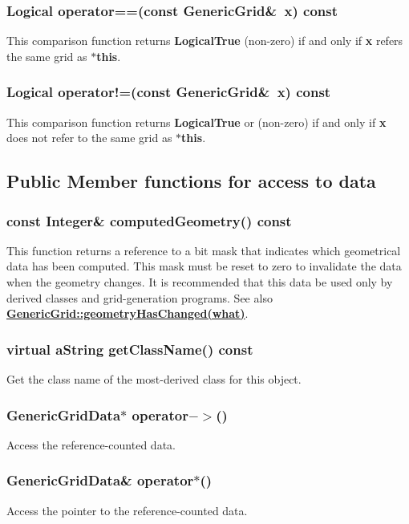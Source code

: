 \documentclass{article}
\begin{document}
  \subsubsection{Logical operator==(const GenericGrid\&~x) const}
  \label{GenericGrid::operator==(x) const}
    This comparison function returns \textbf{LogicalTrue} (non-zero) if and only if \textbf{x} refers the same grid as \textbf{$\ast$this}.
  \subsubsection{Logical operator!=(const GenericGrid\&~x) const}
  \label{GenericGrid::operator!=(x) const}
    This comparison function returns \textbf{LogicalTrue} or (non-zero) if and only if \textbf{x} does not refer to the same grid as \textbf{$\ast$this}.
  \subsection{Public Member functions for access to data}
  \label{GenericGrid::PublicAccessToData}

  \subsubsection{const Integer\& computedGeometry() const}
  \label{GenericGrid::computedGeometry() const}
    This function returns a reference to a bit mask that indicates which geometrical data has been computed.
    This mask must be reset to zero to invalidate the data when the geometry changes.
    It is recommended that this data be used only by derived classes
    and grid-generation programs.
    See also {\bf{}\hyperref{geometryHasChanged(what)}{geometryHasChanged(what) \rm(\S}{)}{GenericGrid::geometryHasChanged(what)}}.
  \subsubsection{virtual aString getClassName() const}
  \label{GenericGrid::getClassName() const}
    Get the class name of the most-derived class for this object.
  \subsubsection{GenericGridData$*$ operator${-}{>}$()}
  \label{GenericGrid::operator->()}
    Access the reference-counted data.
  \subsubsection{GenericGridData\& operator$*$()}
  \label{GenericGrid::operator*()}
    Access the pointer to the reference-counted data.
\end{document}
